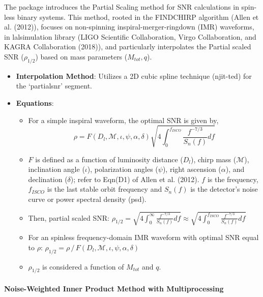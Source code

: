 \documentclass[10pt,a4paper,onecolumn]{article}
\let\textttOrig=\texttt
\def\texttt#1{\expandafter\textttOrig{\seqsplit{#1}}}
\let\oldparagraph\paragraph
\renewcommand{\paragraph}[1]{\oldparagraph{#1}\mbox{}}
\begin{document}
The \emph{\texttt{gwsnr}} package introduces the Partial Scaling method
for SNR calculations in spin-less binary systems. This method, rooted in
the FINDCHIRP algorithm (Allen et al. (2012)), focuses on non-spinning
inspiral-merger-ringdown (IMR) waveforms, in lalsimulation library (LIGO
Scientific Collaboration, Virgo Collaboration, and KAGRA Collaboration
(2018)), and particularly interpolates the Partial scaled SNR
(\(\rho_{1/2}\)) based on mass parameters (\(M_{tot},q\)).

\begin{itemize}
\item
  \textbf{Interpolation Method}: Utilizes a 2D cubic spline technique
  (njit-ted) for the `partialsnr' segment.
\item
  \textbf{Equations}:

  \begin{itemize}
  \item
    For a simple inspiral waveform, the optimal SNR is given by,
    \[\rho = F(D_l,\mathcal{M},\iota,\psi,\alpha, \delta) \sqrt{ 4\int_0^{f_{ISCO}} \frac{f^{-7/3}}{S_n(f)}df }\]
  \item
    \(F\) is defined as a function of luminosity distance (\(D_l\)),
    chirp mass (\(\mathcal{M}\)), inclination angle (\(\iota\)),
    polarization angles (\(\psi\)), right ascension (\(\alpha\)), and
    declination (\(\delta\)); refer to Eqn(D1) of Allen et al. (2012).
    \(f\) is the frequency, \(f_{ISCO}\) is the last stable orbit
    frequency and \(S_n(f)\) is the detector's noise curve or power
    spectral density (psd).
  \item
    Then, partial scaled SNR:
    \(\rho_{1/2} = \sqrt{ 4\int_0^\infty \frac{f^{-7/3}}{S_n(f)}df } \approx \sqrt{ 4\int_0^{f_{ISCO}} \frac{f^{-7/3}}{S_n(f)}df }\)
  \item
    For an spinless frequency-domain IMR waveform with optimal SNR equal
    to \(\rho\):
    \(\rho_{1/2} = \rho\,/\, F(D_l,\mathcal{M},\iota,\psi,\alpha, \delta)\)
  \item
    \(\rho_{1/2}\) is considered a function of \(M_{tot}\) and \(q\).
  \end{itemize}
\end{itemize}

\paragraph{Noise-Weighted Inner Product Method with
Multiprocessing}\label{noise-weighted-inner-product-method-with-multiprocessing}
\end{document}
